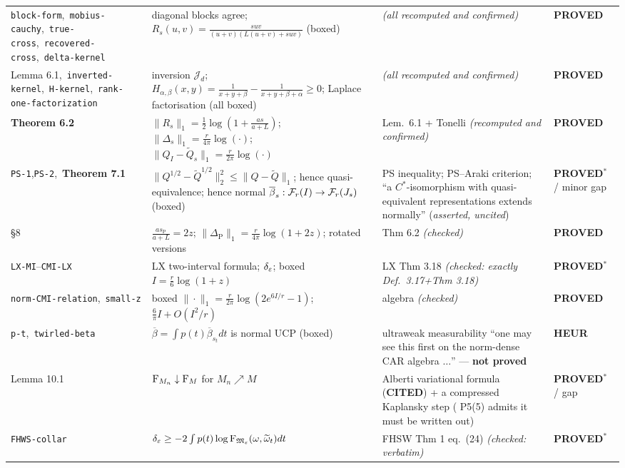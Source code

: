 \documentclass[11pt]{article}
\newcommand{\stPR}{{\color{okgreen}\textsf{\scriptsize\bfseries PROVED}}}
\newcommand{\stPMC}{{\color{teal}\textsf{\scriptsize\bfseries PROVED$^\ast$}}}
\newcommand{\stCIT}{{\color{navy}\textsf{\scriptsize\bfseries CITED}}}
\newcommand{\stHEU}{{\color{warn}\textsf{\scriptsize\bfseries HEUR}}}
\newcommand{\CMI}{I}
\renewcommand{\cJ}{\mathcal J}
\newcommand{\Ord}{\mathrm{P}}
\begin{document}
{\begin{tabularx}{\textwidth}{L{0.155\textwidth} X L{0.210\textwidth} L{0.098\textwidth}}
\texttt{block-form},\allowbreak\ \texttt{mobius-cauchy},\allowbreak\ \texttt{true-cross},\allowbreak\ \texttt{recovered-\allowbreak cross},\allowbreak\ \texttt{delta-kernel} & diagonal blocks agree; $R_s(u,v)=\frac{suv}{(u+v)(L(u+v)+suv)}$ (boxed) & \emph{(all recomputed and confirmed)} & \stPR \\
Lemma 6.1,\ \texttt{inverted-\allowbreak kernel},\allowbreak\ \texttt{H-kernel},\allowbreak\ \texttt{rank-\allowbreak one-\allowbreak factorization} & inversion $\cJ_d$; $H_{\alpha,\beta}(x,y)=\frac1{x+y+\beta}-\frac1{x+y+\beta+\alpha}\ge0$; Laplace factorisation (all boxed) & \emph{(all recomputed and confirmed)} & \stPR \\
\textbf{Theorem 6.2} & $\|R_s\|_1=\frac12\log(1+\frac{as}{a+L})$; $\|\Delta_s\|_1=\frac r{4\pi}\log(\cdot)$; $\|Q_I-\widetilde Q_s\|_1=\frac r{2\pi}\log(\cdot)$ & Lem.\ 6.1 + Tonelli \emph{(recomputed and confirmed)} & \stPR \\
\texttt{PS-1},\allowbreak\texttt{PS-2},\ \textbf{Theorem 7.1} & $\|Q^{1/2}-\widetilde Q^{1/2}\|_2^2\le\|Q-\widetilde Q\|_1$; hence quasi-equivalence; hence normal $\overline\beta_s:\mathcal F_r(I)\to\mathcal F_r(J_s)$ (boxed) & PS inequality; PS--Araki criterion; ``a $C^*$-isomorphism with quasi-equivalent representations extends normally'' (\emph{asserted, uncited}) & \stPMC{} / minor gap \\
\S8 & $\frac{as_\Ord}{a+L}=2z$; $\|\Delta_\Ord\|_1=\frac r{4\pi}\log(1{+}2z)$; rotated versions & Thm 6.2 \emph{(checked)} & \stPR \\
\texttt{LX-MI}--\texttt{CMI-LX} & LX two-interval formula; $\delta_\varepsilon$; boxed $\CMI=\frac r6\log(1+z)$ & LX Thm 3.18 \emph{(checked: exactly Def.~3.17+Thm 3.18)} & \stPMC \\
\texttt{norm-\allowbreak CMI-\allowbreak relation},\allowbreak\ \texttt{small-z} & boxed $\|\cdot\|_1=\frac r{2\pi}\log(2e^{6\CMI/r}-1)$; $\frac6\pi\CMI+O(\CMI^2/r)$ & algebra \emph{(checked)} & \stPR \\
\texttt{p-t},\allowbreak\ \texttt{twirled-beta} & $\overline\beta=\int p(t)\overline\beta_{s_t}dt$ is normal UCP (boxed) & ultraweak measurability ``one may see this first on the norm-dense CAR algebra $\dots$'' --- \textbf{not proved} & \stHEU \\
Lemma 10.1 & $\operatorname{F}_{M_n}\downarrow\operatorname{F}_M$ for $M_n\nearrow M$ & Alberti variational formula (\stCIT) + a compressed Kaplansky step (\NVI{} P5(5) admits it must be written out) & \stPMC{} / gap \\
\texttt{FHWS-collar} & $\delta_\varepsilon\ge-2\int p(t)\log\operatorname{F}_{\mathfrak M_\varepsilon}(\omega,\widetilde\omega_t)dt$ & FHSW Thm 1 eq.~(24) \emph{(checked: verbatim)} & \stPMC \\

\end{tabularx}}
\end{document}
